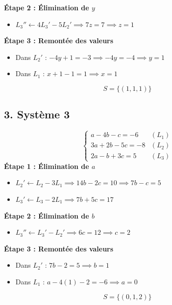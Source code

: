 \documentclass[12pt,a4paper]{article}
\begin{document}
\textbf{Étape 2 : Élimination de $y$}
\begin{itemize}[label=$\bullet$]
    \item $L_3'' \leftarrow 4L_3' - 5L_2' \implies 7z = 7 \implies z = 1$
\end{itemize}

\textbf{Étape 3 : Remontée des valeurs}
\begin{itemize}[label=$\bullet$]
    \item Dans $L_2'$ : $-4y + 1 = -3 \implies -4y = -4 \implies y = 1$
    \item Dans $L_1$ : $x + 1 - 1 = 1 \implies x = 1$
\end{itemize}
\[
S = \{(1, 1, 1)\}
\]

\subsection*{3. Système 3}
\[
\begin{cases}
a - 4b - c = -6 & (L_1) \\
3a + 2b - 5c = -8 & (L_2) \\
2a - b + 3c = 5 & (L_3)
\end{cases}
\]
\textbf{Étape 1 : Élimination de $a$}
\begin{itemize}[label=$\bullet$]
    \item $L_2' \leftarrow L_2 - 3L_1 \implies 14b - 2c = 10 \implies 7b - c = 5$
    \item $L_3' \leftarrow L_3 - 2L_1 \implies 7b + 5c = 17$
\end{itemize}

\textbf{Étape 2 : Élimination de $b$}
\begin{itemize}[label=$\bullet$]
    \item $L_3'' \leftarrow L_3' - L_2' \implies 6c = 12 \implies c = 2$
\end{itemize}

\textbf{Étape 3 : Remontée des valeurs}
\begin{itemize}[label=$\bullet$]
    \item Dans $L_2'$ : $7b - 2 = 5 \implies b = 1$
    \item Dans $L_1$ : $a - 4(1) - 2 = -6 \implies a = 0$
\end{itemize}
\[
S = \{(0, 1, 2)\}
\]
\end{document}
